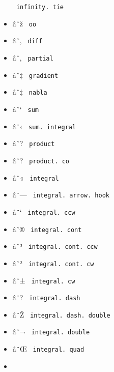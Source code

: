 \begin{itemize}
{  \texttt{\ infinity.\ tie\ }}
\item
  \label{symbol-oo}{{ âˆž } \texttt{\ oo\ }}
\item
  \label{symbol-diff}{{ âˆ‚ } \texttt{\ diff\ }}
\item
  \label{symbol-partial}{{ âˆ‚ } \texttt{\ partial\ }}
\item
  \label{symbol-gradient}{{ âˆ‡ } \texttt{\ gradient\ }}
\item
  \label{symbol-nabla}{{ âˆ‡ } \texttt{\ nabla\ }}
\item
  \label{symbol-sum}{{ âˆ` } \texttt{\ sum\ }}
\item
  \label{symbol-sum.integral}{{ â¨‹ }
  \texttt{\ sum.\ integral\ }}
\item
  \label{symbol-product}{{ âˆ? } \texttt{\ product\ }}
\item
  \label{symbol-product.co}{{ âˆ? }
  \texttt{\ product.\ co\ }}
\item
  \label{symbol-integral}{{ âˆ« } \texttt{\ integral\ }}
\item
  \label{symbol-integral.arrow.hook}{{ â¨--- }
  \texttt{\ integral.\ arrow.\ hook\ }}
\item
  \label{symbol-integral.ccw}{{ â¨` }
  \texttt{\ integral.\ ccw\ }}
\item
  \label{symbol-integral.cont}{{ âˆ® }
  \texttt{\ integral.\ cont\ }}
\item
  \label{symbol-integral.cont.ccw}{{ âˆ³ }
  \texttt{\ integral.\ cont.\ ccw\ }}
\item
  \label{symbol-integral.cont.cw}{{ âˆ² }
  \texttt{\ integral.\ cont.\ cw\ }}
\item
  \label{symbol-integral.cw}{{ âˆ± }
  \texttt{\ integral.\ cw\ }}
\item
  \label{symbol-integral.dash}{{ â¨? }
  \texttt{\ integral.\ dash\ }}
\item
  \label{symbol-integral.dash.double}{{ â¨Ž }
  \texttt{\ integral.\ dash.\ double\ }}
\item
  \label{symbol-integral.double}{{ âˆ¬ }
  \texttt{\ integral.\ double\ }}
\item
  \label{symbol-integral.quad}{{ â¨Œ }
  \texttt{\ integral.\ quad\ }}
\item

\end{itemize}
